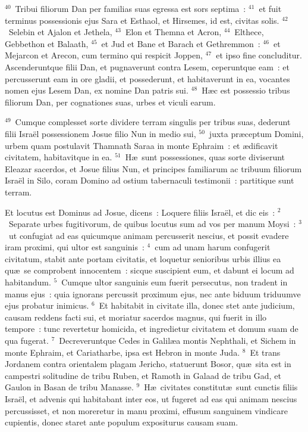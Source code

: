 ${}^{40}$~Tribui filiorum Dan per familias suas egressa est sors septima~:
${}^{41}$~et fuit terminus possessionis ejus Sara et Esthaol, et Hirsemes, id est, civitas solis.
${}^{42}$~Selebin et Ajalon et Jethela,
${}^{43}$~Elon et Themna et Acron,
${}^{44}$~Elthece, Gebbethon et Balaath,
${}^{45}$~et Jud et Bane et Barach et Gethremmon~:
${}^{46}$~et Mejarcon et Arecon, cum termino qui respicit Joppen,
${}^{47}$~et ipso fine concluditur. Ascenderuntque filii Dan, et pugnaverunt contra Lesem, ceperuntque eam~: et percusserunt eam in ore gladii, et possederunt, et habitaverunt in ea, vocantes nomen ejus Lesem Dan, ex nomine Dan patris sui.
${}^{48}$~H\ae c est possessio tribus filiorum Dan, per cognationes suas, urbes et viculi earum.


${}^{49}$~Cumque complesset sorte dividere terram singulis per tribus suas, dederunt filii Isra\"el possessionem Josue filio Nun in medio sui,
${}^{50}$~juxta pr\ae ceptum Domini, urbem quam postulavit Thamnath Saraa in monte Ephraim~: et \ae dificavit civitatem, habitavitque in ea.
${}^{51}$~H\ae\ sunt possessiones, quas sorte diviserunt Eleazar sacerdos, et Josue filius Nun, et principes familiarum ac tribuum filiorum Isra\"el in Silo, coram Domino ad ostium tabernaculi testimonii~: partitique sunt terram.

\lettrine[lines=3,image=true,loversize=0.05,lraise=-0.03]{E}{}t locutus est Dominus ad Josue, dicens~: Loquere filiis Isra\"el, et dic eis~:
${}^{2}$~Separate urbes fugitivorum, de quibus locutus sum ad vos per manum Moysi~:
${}^{3}$~ut confugiat ad eas quicumque animam percusserit nescius, et possit evadere iram proximi, qui ultor est sanguinis~:
${}^{4}$~cum ad unam harum confugerit civitatum, stabit ante portam civitatis, et loquetur senioribus urbis illius ea qu\ae\ se comprobent innocentem~: sicque suscipient eum, et dabunt ei locum ad habitandum.
${}^{5}$~Cumque ultor sanguinis eum fuerit persecutus, non tradent in manus ejus~: quia ignorans percussit proximum ejus, nec ante biduum triduumve ejus probatur inimicus.
${}^{6}$~Et habitabit in civitate illa, donec stet ante judicium, causam reddens facti sui, et moriatur sacerdos magnus, qui fuerit in illo tempore~: tunc revertetur homicida, et ingredietur civitatem et domum suam de qua fugerat.
${}^{7}$~Decreveruntque Cedes in Galil\ae a montis Nephthali, et Sichem in monte Ephraim, et Cariatharbe, ipsa est Hebron in monte Juda.
${}^{8}$~Et trans Jordanem contra orientalem plagam Jericho, statuerunt Bosor, qu\ae\ sita est in campestri solitudine de tribu Ruben, et Ramoth in Galaad de tribu Gad, et Gaulon in Basan de tribu Manasse.
${}^{9}$~H\ae\ civitates constitut\ae\ sunt cunctis filiis Isra\"el, et advenis qui habitabant inter eos, ut fugeret ad eas qui animam nescius percussisset, et non moreretur in manu proximi, effusum sanguinem vindicare cupientis, donec staret ante populum expositurus causam suam.

